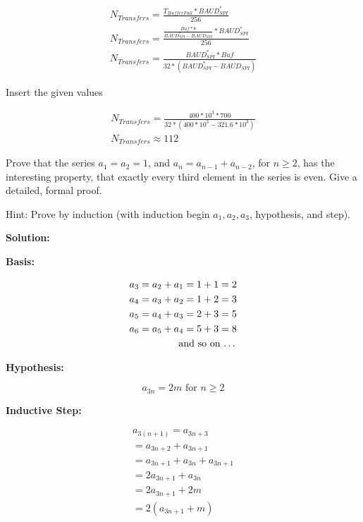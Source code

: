 \documentclass[12pt,a4paper,titlepage,oneside]{article}
\begin{document}
\begin{equation}
\begin{aligned}
N_{Transfers} = \frac{T_{BufferFull}* {BAUD}_{SPI}^{*}}{256} \\
N_{Transfers} = \frac{ \frac{Buf*8}{{BAUD}_{SPI}^{*} - BAUD_{SPI}}* {BAUD}_{SPI}^{*}}{256} \\
N_{Transfers} = \frac{ {BAUD}_{SPI}^{*} * Buf }{32*({BAUD}_{SPI}^{*} -  BAUD_{SPI})}
\end{aligned}
\end{equation}

Insert the given values


\begin{equation}
\begin{aligned}
N_{Transfers} = \frac{ 400*10^3 * 700 }{32*(400*10^3 -  321.6*10^3)} \\
N_{Transfers} \approx 112
\end{aligned}
\end{equation}

  Prove that the series
     $a_1 = a_2 = 1$, and $a_n = a_{n-1}+a_{n-2}$, for $n\ge 2$, has
     the interesting property, that exactly every third element in the
     series is even.
Give a detailed, formal proof.

Hint: Prove by induction (with induction begin $a_1, a_2, a_3$,
     hypothesis, and step).

{\bf Solution:}

{\bf Basis:}

\begin{equation}
\begin{aligned}
a_3 = a_2 + a_1 = 1 + 1 = 2 \\
a_4 = a_3 + a_2 = 1 + 2 = 3 \\
a_5 = a_4 + a_3 = 2 + 3 = 5 \\
a_6 = a_5 + a_4 = 5 + 3 = 8 \\
\text{and so on \dots}
\end{aligned}
\end{equation}

{\bf Hypothesis:}

\begin{equation}
a_{3n} = 2m \text{ for } n \ge 2 
\end{equation}

{\bf Inductive Step:}

\begin{equation}
\begin{aligned}
a_{3(n+1)} = a_{3n+3}\\
 = a_{3n+2} + a_{3n+1}\\
 = a_{3n+1} + a_{3n} + a_{3n+1}\\
 = 2a_{3n+1}+a_{3n}\\
 = 2a_{3n+1} + 2m\\
 = 2(a_{3n+1} + m)
\end{aligned}
\end{equation}
\end{document}
